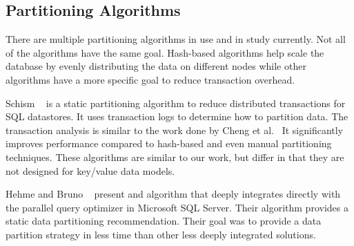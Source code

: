 \subsection{Partitioning Algorithms}
There are multiple partitioning algorithms in use and in study currently.  Not all of the algorithms have the same goal.  Hash-based algorithms help scale the database by evenly distributing the data on different nodes while other algorithms have a more specific goal to reduce transaction overhead.

Schism ~\cite{Curino:2010:SWA:1920841.1920853} is a static partitioning algorithm to reduce distributed transactions for SQL datastores. It uses transaction logs to determine how to partition data. The transaction analysis is similar to the work done by Cheng et al.~\cite{Cheng:2002} It significantly improves performance compared to hash-based and even manual partitioning techniques. These algorithms are similar to our work, but differ in that they are not designed for key/value data models.

Hehme and Bruno ~\cite{Nehme:2011:APD:1989323.1989444} present and algorithm that deeply integrates directly with the parallel query optimizer in Microsoft SQL Server.  Their algorithm provides a static data partitioning recommendation.  Their goal was to provide a data partition strategy in less time than other less deeply integrated solutions.